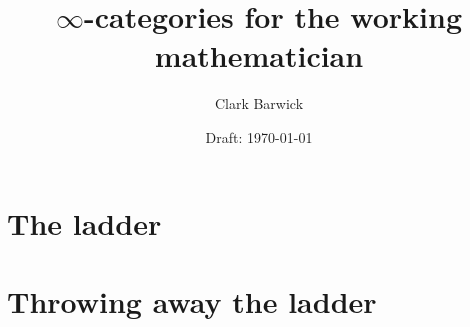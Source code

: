 \documentclass{cambridge7A}
\begin{document}
\author{Clark Barwick}
\title{$\infty$-categories for the working mathematician}
\date{Draft: \today}
\subtitle{}
\maketitle

\frontmatter

%
%
%
%

\setcounter{tocdepth}{2}
\tableofcontents

%

\mainmatter



\part{The ladder}

\noindent 



\part{Throwing away the ladder}

\noindent 

\appendix

\backmatter




%
%

\end{document}
